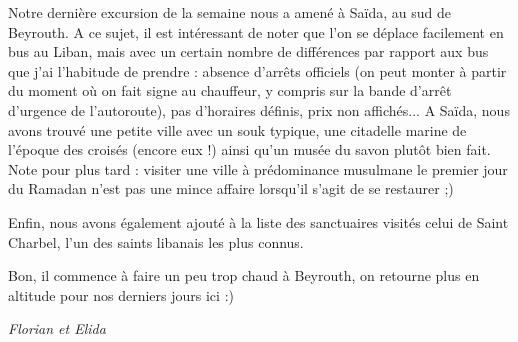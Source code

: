 Notre dernière excursion de la semaine nous a amené à Saïda, au sud de
Beyrouth. A ce sujet, il est intéressant de noter que l'on se déplace
facilement en bus au Liban, mais avec un certain nombre de différences
par rapport aux bus que j'ai l'habitude de prendre : absence d'arrêts
officiels (on peut monter à partir du moment où on fait signe au
chauffeur, y compris sur la bande d'arrêt d'urgence de l'autoroute), pas
d'horaires définis, prix non affichés... A Saïda, nous avons trouvé une
petite ville avec un souk typique, une citadelle marine de l'époque des
croisés (encore eux !) ainsi qu'un musée du savon plutôt bien fait. Note
pour plus tard : visiter une ville à prédominance musulmane le premier
jour du Ramadan n'est pas une mince affaire lorsqu'il s'agit de se
restaurer ;)

Enfin, nous avons également ajouté à la liste des sanctuaires visités
celui de Saint Charbel, l'un des saints libanais les plus connus.

Bon, il commence à faire un peu trop chaud à Beyrouth, on retourne plus
en altitude pour nos derniers jours ici :)

\emph{Florian et Elida}
